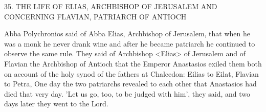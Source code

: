 35.
THE LIFE OF ELIAS, ARCHBISHOP OF JERUSALEM
AND CONCERNING FLAVIAN, PATRIARCH OF ANTIOCH

Abba Polychronios said of Abba Elias, Archbishop of Jerusalem,
that when he was a monk he never drank wine and after he became
patriarch he continued to observe the same rule.
They said of
Archbishop <Elias> of Jerusalem and of Flavian the Archbishop of
Antioch that the Emperor Anastasios exiled them both on account
of the holy synod of the fathers at Chalcedon: Eilias to Eilat,
Flavian to Petra, One day the two patriarchs revealed to each other
that Anastasios had died that very day.
'Let us go, too, to be judged
with him', they said, and two days later they went to the Lord.

